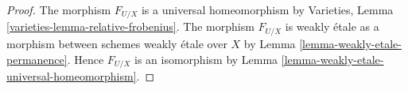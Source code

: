 \documentclass[10pt,a4paper]{amsart}
\theoremstyle{plain}
\theoremstyle{definition}
\theoremstyle{remark}
\numberwithin{equation}{subsection}
\begin{document}
\begin{proof}
The morphism $F_{U/X}$ is a universal homeomorphism by
Varieties, Lemma \ref{varieties-lemma-relative-frobenius}.
The morphism $F_{U/X}$ is weakly \'etale as a morphism
between schemes weakly \'etale over $X$ by
Lemma \ref{lemma-weakly-etale-permanence}. Hence $F_{U/X}$
is an isomorphism by Lemma \ref{lemma-weakly-etale-universal-homeomorphism}.
\end{proof}
\end{document}
